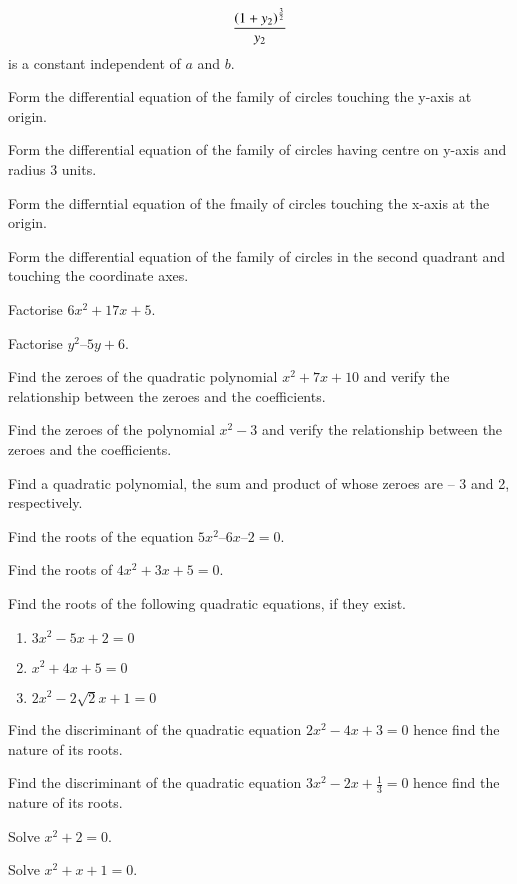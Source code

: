 \begin{align}
\frac{\left(1+y_2\right)^\frac{3}{2}}{y_2}
\end{align}
%
is a constant independent of $a$ and $b$.
%
\item Form the differential equation of the family of circles touching the y-axis at origin.
\item Form the differential equation of the family of circles having centre on y-axis and radius 3 units.
\item Form the differntial equation of the fmaily of circles touching the x-axis at the origin.
%
\item Form the differential equation of the family of circles in the second quadrant and touching the coordinate axes.
\item Factorise $6x^2+ 17x + 5$.
\\
\solution 

\item Factorise $y^2 – 5y + 6$.
\item Find the zeroes of the quadratic polynomial $x^2+7x+10$ and verify the relationship between the zeroes and the coefficients.
\item Find the zeroes of the polynomial $x^2-3$ and verify the relationship between the zeroes and the coefficients.
\item Find a quadratic polynomial, the sum and product of whose zeroes are – 3 and 2, respectively.
%
\item Find the roots of the equation $5x^2  – 6x – 2 = 0 $.
\item Find the roots of $4x^2 + 3x + 5 = 0 $.
\item Find the roots of the following quadratic equations, if they exist.
\begin{enumerate}
\item 	$3x^2-5x+2 = 0$
\item 	$x^2+4x+5 = 0$
\item 	$2x^2-2\sqrt{2}x+1 = 0$
\end{enumerate}
%
\item Find the discriminant of the quadratic equation $2x^2-4x+3 = 0$
hence find the nature of its roots.
\\
\solution

\item Find the discriminant of the quadratic equation $3x^2-2x+\frac{1}{3} = 0$
hence find the nature of its roots.
\item Solve $x^2+ 2 = 0 $.
\item Solve $x^2+ x+1 = 0 $.
